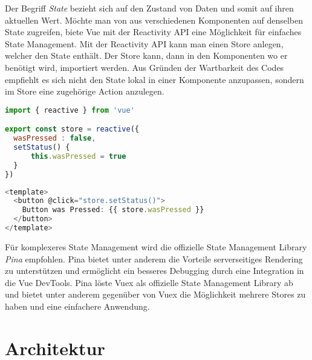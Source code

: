 Der Begriff \emph{State} bezieht sich auf den Zustand von Daten und somit auf ihren aktuellen Wert.
Möchte man von aus verschiedenen Komponenten auf denselben State zugreifen,
biete Vue mit der Reactivity API eine Möglichkeit für einfaches State Management.
Mit der Reactivity API kann man einen Store anlegen, welcher den State enthält.
Der Store kann, dann in den Komponenten wo er benötigt wird, importiert werden.
Aus Gründen der Wartbarkeit des Codes empfiehlt es sich nicht den State lokal in einer Komponente anzupassen,
sondern im Store eine zugehörige Action anzulegen. \cite{vueStateManagement}

\begin{lstlisting}[caption={Anlegen eines Stores mit Reactivity API},language=javascript,label={lst:Anlegen-Store}]
import { reactive } from 'vue'

export const store = reactive({
  wasPressed : false,
  setStatus() {
      this.wasPressed = true
  }
})
\end{lstlisting}

\begin{lstlisting}[caption={Vewendung des Stores},language=javascript,label={lst:Verwendung-Store}]
<template>
  <button @click="store.setStatus()">
    Button was Pressed: {{ store.wasPressed }}
  </button>
</template>
\end{lstlisting}

Für komplexeres State Management wird die offizielle State Management Library \emph{Pina} empfohlen.
Pina bietet unter anderem die Vorteile serverseitiges Rendering zu unterstützen und
ermöglicht ein besseres Debugging durch eine Integration in die Vue DevTools.
Pina löste Vuex als offizielle State Management Library ab und bietet unter anderem gegenüber von Vuex
die Möglichkeit mehrere Stores zu haben und eine einfachere Anwendung.  \cite{vueStateManagement}

\section{Architektur}
